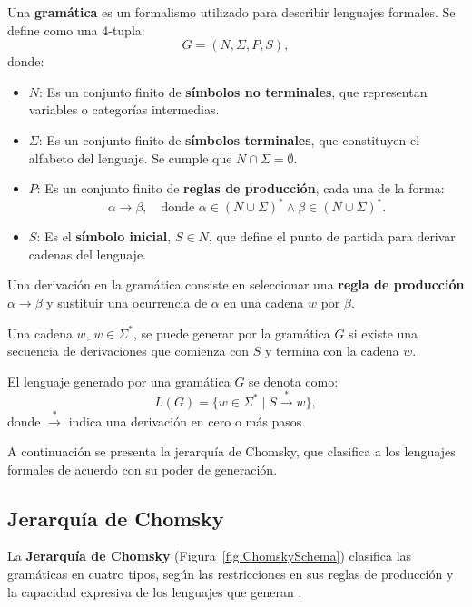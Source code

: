 Una \textbf{gramática} es un formalismo utilizado para describir lenguajes formales. Se define como una 4-tupla:
\[
      G = (N, \Sigma, P, S),
\]
donde:
\begin{itemize}
      \item \(N\): Es un conjunto finito de \textbf{símbolos no terminales}, que representan variables o categorías intermedias.
      \item \(\Sigma\): Es un conjunto finito de \textbf{símbolos terminales}, que constituyen el alfabeto del lenguaje. Se cumple que \(N \cap \Sigma = \emptyset\).
      \item \(P\): Es un conjunto finito de \textbf{reglas de producción}, cada una de la forma:
            \[
                  \alpha \to \beta, \quad \text{donde } \alpha \in (N \cup \Sigma)^* \wedge \beta \in (N \cup \Sigma)^*.
            \]
      \item \(S\): Es el \textbf{símbolo inicial}, \(S \in N\), que define el punto de partida para derivar cadenas del lenguaje.
\end{itemize}

Una derivación en la gramática consiste en seleccionar una \textbf{regla de producción} $\alpha \to \beta$ y sustituir una ocurrencia de 
$\alpha$ en una cadena $w$ por $\beta$.

Una cadena $w$, $w\in\Sigma^*$,  se puede generar por la gramática $G$ si existe una secuencia de derivaciones que comienza con $S$
y termina con la cadena $w$.

El lenguaje generado por una gramática \(G\) se denota como:
\[
      L(G) = \{ w \in \Sigma^* \mid S \overset{*}{\to} w \},
\]
donde \(\overset{*}{\to}\) indica una derivación en cero o más pasos.

A continuación se presenta la jerarquía de Chomsky, que clasifica a los lenguajes formales de acuerdo con su poder de generación.

\subsection{Jerarquía de Chomsky}

La \textbf{Jerarquía de Chomsky} (Figura~\ref{fig:ChomskySchema}) clasifica las gramáticas en cuatro tipos, según las restricciones en sus reglas de producción y la capacidad expresiva de los lenguajes que generan \cite{geeksforgeeks_chomsky_hierarchy}.

